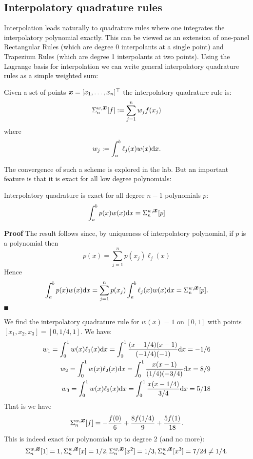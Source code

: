 \subsection{Interpolatory quadrature rules}
Interpolation leads naturally to quadrature rules where one integrates the interpolatory polynomial exactly. This can be viewed as an extension of one-panel Rectangular Rules (which are degree 0 interpolants at a single point) and Trapezium Rules (which are degree 1 interpolants at two points).  Using the Lagrange basis for interpolation we can write general interpolatory quadrature rules as a simple weighted sum:

\begin{definition} Given a set of points $\bm{{\mbox{\boldmath$x$\unboldmath}}} = [x_1,\ldots,x_n]^\top$ the interpolatory quadrature rule is:
\[
\Sigma_n^{w,\bm{{\mbox{\boldmath$x$\unboldmath}}}}[f] := \sum_{j=1}^n w_j f(x_j)
\]
where
\[
w_j := \ensuremath{\int}_a^b \ensuremath{\ell}_j(x) w(x) {\rm d} x.
\]
\end{definition}

The convergence of such a scheme is explored in the lab. But an important feature is that it is exact for all low degree polynomials:

\begin{proposition}  Interpolatory quadrature is exact for all degree $n-1$ polynomials $p$:
\[
\int_a^b p(x) w(x) {\rm d}x = \Sigma_n^{w,\bm{{\mbox{\boldmath$x$\unboldmath}}}}[p]
\]
\end{proposition}
\textbf{Proof} The result follows since, by uniqueness of interpolatory polynomial, if $p$ is a polynomial then
\[
p(x) = \ensuremath{\sum}_{j=1}^n p(x_j) \ensuremath{\ell}_j(x)
\]
Hence
\[
\int_a^b p(x) w(x) {\rm d}x = \sum_{j=1}^n p(x_j) \int_a^b \ell_j(x) w(x) {\rm d}x = \Sigma_n^{w,\bm{{\mbox{\boldmath$x$\unboldmath}}}}[p].
\]
\ensuremath{\QED}

\begin{example} We find the interpolatory quadrature rule for $w(x) = 1$ on $[0,1]$ with  points $[x_1,x_2,x_3] = [0,1/4,1]$. We have:
\begin{align*}
w_1 = \int_0^1 w(x) \ensuremath{\ell}_1(x) {\rm d}x  = \int_0^1 {(x-1/4)(x-1) \over (-1/4)(-1)}{\rm d}x = -1/6 \\
w_2 = \int_0^1 w(x) \ensuremath{\ell}_2(x) {\rm d}x  = \int_0^1 {x(x-1) \over (1/4)(-3/4)}{\rm d}x = 8/9 \\
w_3 = \int_0^1 w(x) \ensuremath{\ell}_3(x) {\rm d}x  = \int_0^1 {x(x-1/4) \over 3/4}{\rm d}x = 5/18
\end{align*}
That is we have
\[
\Sigma_n^{w,\bm{{\mbox{\boldmath$x$\unboldmath}}}}[f]  = -{f(0) \over 6} + {8f(1/4) \over 9} + {5 f(1) \over 18}.
\]
This is indeed exact for polynomials up to degree $2$ (and no more):
\[
\Sigma_n^{w,\bm{{\mbox{\boldmath$x$\unboldmath}}}}[1] = 1, \Sigma_n^{w,\bm{{\mbox{\boldmath$x$\unboldmath}}}}[x] = 1/2, \Sigma_n^{w,\bm{{\mbox{\boldmath$x$\unboldmath}}}}[x^2] = 1/3, \Sigma_n^{w,\bm{{\mbox{\boldmath$x$\unboldmath}}}}[x^3] = 7/24 \neq 1/4.
\]
\end{example}

